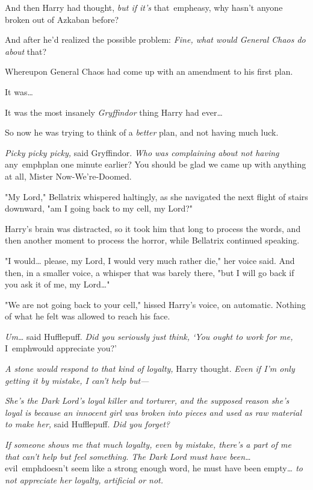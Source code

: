 And then Harry had thought, \emph{but if it's} that\ emph{easy, why hasn't 
anyone broken out of Azkaban before?}

And after he'd realized the possible problem: \emph{Fine, what would General 
Chaos do about} that?

Whereupon General Chaos had come up with an amendment to his first plan.

It was{\ldots}

It was the most insanely \emph{Gryffindor} thing Harry had ever{\ldots}

So now he was trying to think of a \emph{better} plan, and not having much luck.

\emph{Picky picky picky,} said Gryffindor. \emph{Who was complaining about not 
having} any\ emph{plan one minute earlier? You should be glad we came up with 
anything at all, Mister Now-We're-Doomed.}

"My Lord," Bellatrix whispered haltingly, as she navigated the next flight of 
stairs downward, "am I going back to my cell, my Lord?"

Harry's brain was distracted, so it took him that long to process the words, 
and then another moment to process the horror, while Bellatrix continued 
speaking.

"I would{\ldots} please, my Lord, I would very much rather die," her voice 
said. And then, in a smaller voice, a whisper that was barely there, "but I 
will go back if you ask it of me, my Lord{\ldots}"

"We are not going back to your cell," hissed Harry's voice, on automatic. 
Nothing of what he felt was allowed to reach his face.

\emph{Um{\ldots}} said Hufflepuff. \emph{Did you seriously just think, `You 
ought to work for me,} I\ emph{would appreciate you?'}

\emph{A stone would respond to that kind of loyalty,} Harry thought. \emph{Even 
if I'm only getting it by mistake, I can't help but---}

\emph{She's the Dark Lord's loyal killer and torturer, and the supposed reason 
she's loyal is because an innocent girl was broken into pieces and used as raw 
material to make her,} said Hufflepuff. \emph{Did you forget?}

\emph{If someone shows me that much loyalty, even by mistake, there's a part of 
me that can't help but feel something. The Dark Lord must have been{\ldots}} 
evil\ emph{doesn't seem like a strong enough word, he must have been} 
empty\emph{{\ldots} to not appreciate her loyalty, artificial or not.}

